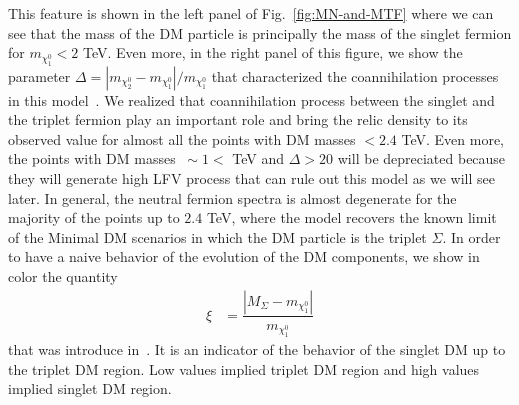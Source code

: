 \documentclass[12pt,letterpaper]{article}
\begin{document}
This feature is shown in the left panel of Fig.~\ref{fig:MN-and-MTF} where we can see that the mass of the DM particle is principally the mass of the singlet fermion for $m_{\chi_1^0}<2$ TeV. 
Even more, in the right panel of this figure, we show the parameter $\Delta=|m_{\chi_2^0}-m_{\chi_1^0}|/m_{\chi_1^0}$ that characterized the coannihilation processes in this model~\cite{Griest:1990kh}. 
We realized that coannihilation process between the singlet and the triplet fermion play an important role and bring the relic density to its observed value for almost all the points with DM masses $<2.4$ TeV. Even more, the points with DM masses $~\sim 1<$ TeV and $\Delta > 20$ will be depreciated because they will generate high LFV process that can rule out this model as we will see later. 
In general, the neutral fermion spectra is almost degenerate for the majority of the points up to $2.4$ TeV, where the model recovers the known limit of the Minimal DM scenarios in which the DM particle is the triplet $\Sigma$. 
In order to have a naive behavior of the evolution of the DM components, we show in color the quantity
%
\begin{align}
\label{eq:xi}
\xi &=\dfrac{|M_\Sigma - m_{\chi^0_1}|}{m_{\chi^0_1}}
\end{align}
%
that was introduce in~\cite{Hirsch:2013ola}. It is an indicator of the behavior of the singlet DM up to the triplet DM region. Low values implied triplet DM region and high values implied singlet DM region.
%
\end{document}
